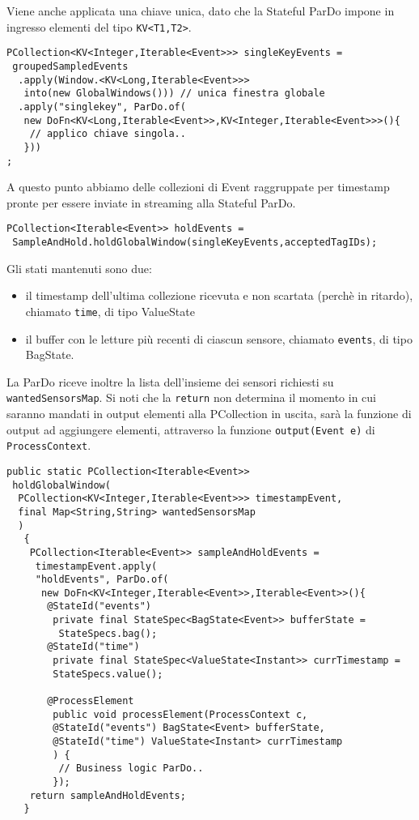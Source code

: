Viene anche applicata una chiave unica, dato che la Stateful ParDo impone in ingresso elementi del tipo \texttt{KV<T1,T2>}.
\begin{lstlisting}
PCollection<KV<Integer,Iterable<Event>>> singleKeyEvents = 
 groupedSampledEvents
  .apply(Window.<KV<Long,Iterable<Event>>>
   into(new GlobalWindows())) // unica finestra globale
  .apply("singlekey", ParDo.of(
   new DoFn<KV<Long,Iterable<Event>>,KV<Integer,Iterable<Event>>>(){
    // applico chiave singola.. 
   }))
;
\end{lstlisting}
A questo punto abbiamo delle collezioni di Event raggruppate per timestamp pronte per essere inviate in streaming alla Stateful ParDo. 
\begin{lstlisting}
PCollection<Iterable<Event>> holdEvents =
 SampleAndHold.holdGlobalWindow(singleKeyEvents,acceptedTagIDs);
\end{lstlisting}
Gli stati mantenuti sono due:
\begin{itemize}
\item il timestamp dell'ultima collezione ricevuta e non scartata (perchè in ritardo), chiamato \texttt{time}, di tipo ValueState
\item il buffer con le letture più recenti di ciascun sensore, chiamato \texttt{events}, di tipo BagState.
\end{itemize}
La ParDo riceve inoltre la lista dell'insieme dei sensori richiesti su \texttt{wantedSensorsMap}. Si noti che la \texttt{return} non determina il momento in cui saranno mandati in output elementi alla PCollection in uscita, sarà la funzione di output ad aggiungere elementi, attraverso la funzione \texttt{output(Event e)} di \texttt{ProcessContext}.
\begin{lstlisting}
public static PCollection<Iterable<Event>>
 holdGlobalWindow(
  PCollection<KV<Integer,Iterable<Event>>> timestampEvent,
  final Map<String,String> wantedSensorsMap
  )
   {
    PCollection<Iterable<Event>> sampleAndHoldEvents = 
     timestampEvent.apply(
     "holdEvents", ParDo.of(
      new DoFn<KV<Integer,Iterable<Event>>,Iterable<Event>>(){
       @StateId("events")
        private final StateSpec<BagState<Event>> bufferState =
         StateSpecs.bag();
       @StateId("time")
        private final StateSpec<ValueState<Instant>> currTimestamp = 
        StateSpecs.value();
       
       @ProcessElement
        public void processElement(ProcessContext c,
        @StateId("events") BagState<Event> bufferState,
        @StateId("time") ValueState<Instant> currTimestamp
        ) {
         // Business logic ParDo..
        });
    return sampleAndHoldEvents;
   }
\end{lstlisting}
